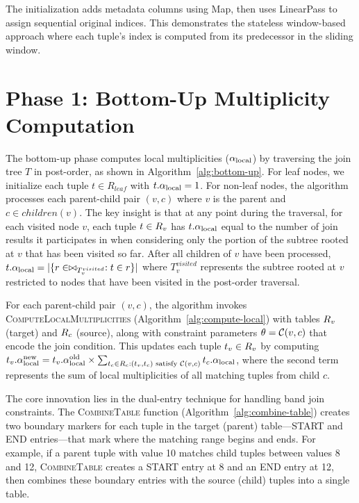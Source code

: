 The initialization adds metadata columns using Map, then uses LinearPass to assign sequential original indices. This demonstrates the stateless window-based approach where each tuple's index is computed from its predecessor in the sliding window. 
\section{Phase 1: Bottom-Up Multiplicity Computation}
\label{sec:bottom-up}

The bottom-up phase computes local multiplicities ($\alpha_{\text{local}}$) by traversing the join tree $T$ in post-order, as shown in Algorithm~\ref{alg:bottom-up}. For leaf nodes, we initialize each tuple $t \in R_{leaf}$ with $t.\alpha_{\text{local}} = 1$. For non-leaf nodes, the algorithm processes each parent-child pair $(v, c)$ where $v$ is the parent and $c \in children(v)$. The key insight is that at any point during the traversal, for each visited node $v$, each tuple $t \in R_v$ has $t.\alpha_{\text{local}}$ equal to the number of join results it participates in when considering only the portion of the subtree rooted at $v$ that has been visited so far. After all children of $v$ have been processed, $t.\alpha_{\text{local}} = |\{r \in \bowtie_{T_v^{visited}} : t \in r\}|$ where $T_v^{visited}$ represents the subtree rooted at $v$ restricted to nodes that have been visited in the post-order traversal.

For each parent-child pair $(v, c)$, the algorithm invokes \textsc{ComputeLocalMultiplicities} (Algorithm~\ref{alg:compute-local}) with tables $R_v$ (target) and $R_c$ (source), along with constraint parameters $\theta = \mathcal{C}(v,c)$ that encode the join condition. This updates each tuple $t_v \in R_v$ by computing ${t_v}.\alpha_{\text{local}}^{\text{new}} = {t_v}.\alpha_{\text{local}}^{\text{old}} \times \sum_{t_c \in R_c : (t_v, t_c) \text{ satisfy } \mathcal{C}(v,c)} t_c.\alpha_{\text{local}}$, where the second term represents the sum of local multiplicities of all matching tuples from child $c$.

The core innovation lies in the dual-entry technique for handling band join constraints. The \textsc{CombineTable} function (Algorithm~\ref{alg:combine-table}) creates two boundary markers for each tuple in the target (parent) table---START and END entries---that mark where the matching range begins and ends. For example, if a parent tuple with value 10 matches child tuples between values 8 and 12, \textsc{CombineTable} creates a START entry at 8 and an END entry at 12, then combines these boundary entries with the source (child) tuples into a single table.

